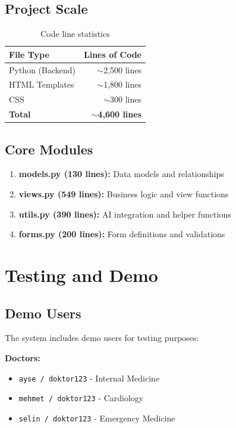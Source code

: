 \documentclass[12pt,a4paper]{article}
\begin{document}
\subsection{Project Scale}
\begin{table}[h!]
\centering
\begin{tabular}{|l|r|}
\hline
\textbf{File Type} & \textbf{Lines of Code} \\
\hline
Python (Backend) & $\sim$2,500 lines \\
HTML Templates & $\sim$1,800 lines \\
CSS & $\sim$300 lines \\
\hline
\textbf{Total} & \textbf{$\sim$4,600 lines} \\
\hline
\end{tabular}
\caption{Code line statistics}
\end{table}

\subsection{Core Modules}
\begin{enumerate}
    \item \textbf{models.py (130 lines):} Data models and relationships
    \item \textbf{views.py (549 lines):} Business logic and view functions
    \item \textbf{utils.py (390 lines):} AI integration and helper functions
    \item \textbf{forms.py (200 lines):} Form definitions and validations
\end{enumerate}

\section{Testing and Demo}

\subsection{Demo Users}
The system includes demo users for testing purposes:

\textbf{Doctors:}
\begin{itemize}
    \item \texttt{ayse / doktor123} - Internal Medicine
    \item \texttt{mehmet / doktor123} - Cardiology
    \item \texttt{selin / doktor123} - Emergency Medicine
\end{itemize}
\end{document}
